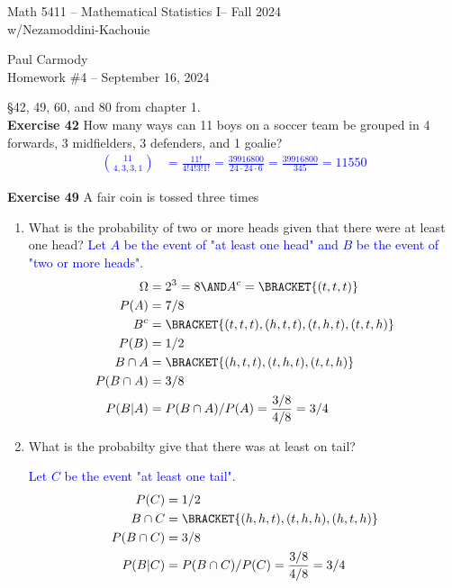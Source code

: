 \documentclass[10pt,a4paper]{report}
\newcommand{\CLASSNAME}{Math 5411 -- Mathematical Statistics I}
\newcommand{\PROFESSOR}{Nezamoddini-Kachouie}
\newcommand{\STUDENTNAME}{Paul Carmody}
\newcommand{\ASSIGNMENT}{Homework \#4 }
\newcommand{\DUEDATE}{September 16, 2024}
\newcommand{\SEMESTER}{Fall 2024}
\newcommand{\BLUE}[1]{\textcolor{blue}{#1}}
\begin{document}
\begin{center}
	\Large{\CLASSNAME -- \SEMESTER} \\
	\large{w/\PROFESSOR}
\end{center}
\begin{center}
	\STUDENTNAME \\
	\ASSIGNMENT -- \DUEDATE\\
\end{center}

\S 42, 49, 60, and 80 from chapter 1.\\

\noindent\textbf{Exercise 42} How many ways can 11 boys on a soccer team be grouped in 4 forwards, 3 midfielders, 3 defenders, and 1 goalie?\\
\BLUE{
\begin{align*}
	\binom{11}{4,3,3,1} &= \frac{11!}{4!4!3!1!} = \frac{39916800}{24\cdot 24 \cdot 6} = \frac{39916800}{345}= 11550
\end{align*}
}

\noindent\textbf{Exercise 49} A fair coin is tossed three times
\begin{enumerate}
	\item What is the probability of two or more heads given that there were at least one head?
	\BLUE{Let $A$ be the event of "at least one head" and $B$ be the event of "two or more heads".\begin{align*}
		\Omega &= 2^3 = 8 \AND A^c = \BRACKET{ (t,t,t) }\\
		P(A) &= 7/8\\
		B^c &= \BRACKET{ (t,t,t), (h,t,t), (t,h,t), (t,t,h)}\\
		P(B) &= 1/2 \\
		B \cap A &= \BRACKET{ (h,t,t), (t,h,t), (t,t,h)}\\
		P(B\cap A) &= 3/8\\
		P(B|A) &= P(B \cap A)/P(A) = \frac{3/8}{4/8} = 3/4
	\end{align*} }
	
	\item What is the probabilty give that there was at least on tail?
	
	\BLUE{Let $C$ be the event "at least one tail".
	\begin{align*}
		P(C) &= 1/2 \\
		B\cap C &= \BRACKET{ (h,h,t), (t,h,h), (h,t,h) }\\
		P(B \cap C) &= 3/8\\
		P(B|C) &= P(B \cap C)/P(C) = \frac{3/8}{4/8} = 3/4
	\end{align*}
	}
\end{enumerate}
\end{document}
